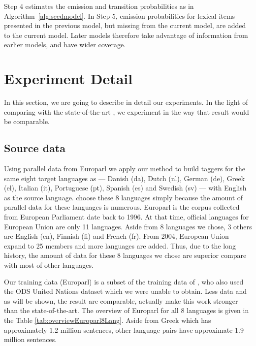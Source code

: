 Step 4 estimates the emission and transition probabilities as in
Algorithm~\ref{alg:seedmodel}. In Step 5, emission probabilities for
lexical items presented in the previous model, but missing from the current
model, are added to the current model. Later models therefore take
advantage of information from earlier models, and have wider coverage.

\section{Experiment Detail}
\label{sec:experimentDetail}


In this section, we are going to describe in detail our experiments. In the light of comparing with the state-of-the-art \cite{Das:2011}, we experiment in the way that result would be comparable. 

\subsection{Source data}
Using parallel data from Europarl \cite{europarl} we apply our method
to build taggers for the same eight target languages as
 --- Danish (da), Dutch (nl), German (de), Greek (el), Italian (it), Portuguese (pt), Spanish (es) and Swedish (sv) --- with English as the source language.  choose these 8 languages simply because the amount of parallel data for these languages is numerous. Europarl is the corpus collected from European Parliament date back to 1996. At that time, official languages for European Union are only 11 languages. Aside from 8 languages we chose, 3 others are English (en), Finnish (fi) and French (fr). From 2004, European Union expand to 25 members and more languages are added. Thus, due to the long history, the amount of data for these 8 languages we chose are superior compare with most of other languages. 

Our training data (Europarl) is a subset of the training data of
, who also used the ODS United Nations dataset
which we were unable to obtain. Less data and as will be shown, the result are comparable, actually make this work stronger than the state-of-the-art. The overview of Europarl for all 8 languages is given in the Table \ref{tab:overviewEuroparl8Lang}. Aside from Greek which has approximately 1.2 million sentences, other language pairs have approximate 1.9 million sentences. 

